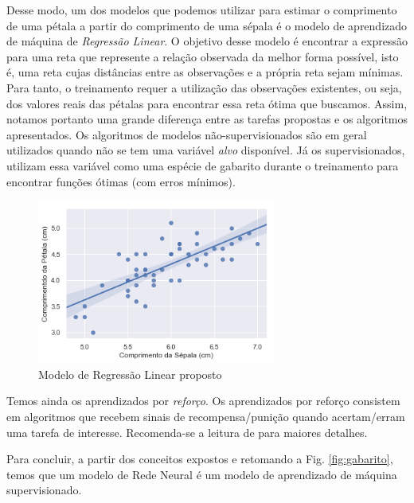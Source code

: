 Desse modo, um dos modelos que podemos utilizar para estimar o comprimento de uma pétala a partir do comprimento de uma sépala é o modelo de aprendizado de máquina de \textit{Regressão Linear}. O objetivo desse modelo é encontrar a expressão para uma reta que represente a relação observada da melhor forma possível, isto é, uma reta cujas distâncias entre as observações e a própria reta sejam mínimas. Para tanto, o treinamento requer a utilização das observações existentes, ou seja, dos valores reais das pétalas para encontrar essa reta ótima que buscamos. Assim, notamos portanto uma grande diferença entre as tarefas propostas e os algoritmos apresentados. Os algoritmos de modelos não-supervisionados são em geral utilizados quando não se tem uma variável \textit{alvo} disponível. Já os supervisionados, utilizam essa variável como uma espécie de gabarito durante o treinamento para encontrar funções ótimas (com erros mínimos).

\begin{figure}[H]
    \centering
    \includegraphics[width=0.7\textwidth]{img/reg_iris.png}
    \caption{Modelo de Regressão Linear proposto}
    \label{fig:my_label}
\end{figure}

Temos ainda os aprendizados por \textit{reforço}. Os aprendizados por reforço consistem em algoritmos que recebem sinais de recompensa/punição quando acertam/erram uma tarefa de interesse. Recomenda-se a leitura de \cite{KLMSurvey:1996} para maiores detalhes.

Para concluir, a partir dos conceitos expostos e retomando a Fig. \ref{fig:gabarito}, temos que um modelo de Rede Neural é um modelo de aprendizado de máquina supervisionado. 

